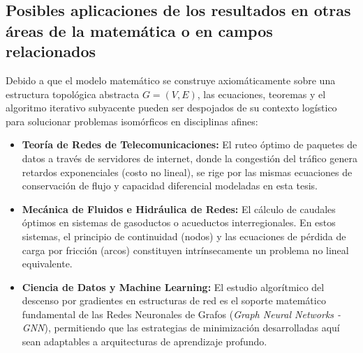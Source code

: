 \subsection{Posibles aplicaciones de los resultados en otras áreas de la matemática o en campos relacionados}
Debido a que el modelo matemático se construye axiomáticamente sobre una estructura topológica abstracta $G=(V,E)$, las ecuaciones, teoremas y el algoritmo iterativo subyacente pueden ser despojados de su contexto logístico para solucionar problemas isomórficos en disciplinas afines:
\begin{itemize}
    \item \textbf{Teoría de Redes de Telecomunicaciones:} El ruteo óptimo de paquetes de datos a través de servidores de internet, donde la congestión del tráfico genera retardos exponenciales (costo no lineal), se rige por las mismas ecuaciones de conservación de flujo y capacidad diferencial modeladas en esta tesis.
    \item \textbf{Mecánica de Fluidos e Hidráulica de Redes:} El cálculo de caudales óptimos en sistemas de gasoductos o acueductos interregionales. En estos sistemas, el principio de continuidad (nodos) y las ecuaciones de pérdida de carga por fricción (arcos) constituyen intrínsecamente un problema no lineal equivalente.
    \item \textbf{Ciencia de Datos y Machine Learning:} El estudio algorítmico del descenso por gradientes en estructuras de red es el soporte matemático fundamental de las Redes Neuronales de Grafos (\textit{Graph Neural Networks - GNN}), permitiendo que las estrategias de minimización desarrolladas aquí sean adaptables a arquitecturas de aprendizaje profundo.
\end{itemize}
